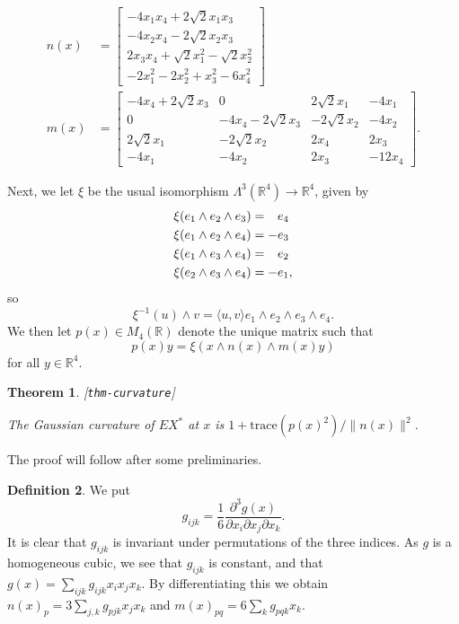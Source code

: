 \documentclass[reqno]{amsart}
\newcommand{\lbl}[1]{\label{#1}\textup{[\texttt{#1}]}\par}
\newcommand{\lbl}{\label}
\newcommand{\Lm}        {\Lambda}
\newcommand{\R}         {{\mathbb{R}}}
\newcommand{\ip}[1]     {\langle #1\rangle}
\newcommand{\rt}        {\sqrt{2}}
\newcommand{\pp}        {\hphantom{+}}
\renewcommand{\:}{\colon}
\newtheorem{theorem}{Theorem}[subsection]
\theoremstyle{definition}
\newtheorem{definition}[theorem]{Definition}
\begin{document}
\begin{align*}
 n(x) &= \left[\begin{array}{c}
           -4 x_1 x_4+2\rt x_1 x_3 \\
           -4 x_2 x_4-2\rt x_2 x_3 \\
           2 x_3 x_4+\rt x_1^2-\rt x_2^2 \\
           -2 x_1^2-2 x_2^2+x_3^2-6 x_4^2
         \end{array}\right] \\
 m(x) &=  \left[ \begin {array}{cccc}
            -4 x_4+2\rt x_3&0&2\rt x_1&-4 x_1 \\
            0&-4 x_4-2\rt x_3&-2\rt x_2&-4 x_2\\
            2\rt x_1&-2\rt x_2&2 x_4&2 x_3 \\
            -4 x_1&-4 x_2&2 x_3&-12 x_4
          \end {array} \right] .
\end{align*}

Next, we let $\xi$ be the usual isomorphism $\Lm^3(\R^4)\to\R^4$,
given by
\begin{align*}
 \xi(e_1\wedge e_2\wedge e_3) &= \pp e_4 \\
 \xi(e_1\wedge e_2\wedge e_4) &=    -e_3 \\
 \xi(e_1\wedge e_3\wedge e_4) &= \pp e_2 \\
 \xi(e_2\wedge e_3\wedge e_4) &=    -e_1,
\end{align*}
so
\[ \xi^{-1}(u)\wedge v =
     \ip{u,v} e_1\wedge e_2\wedge e_3\wedge e_4.
\]
We then let $p(x)\in M_4(\R)$ denote the unique matrix such that
\[ p(x)y = \xi(x\wedge n(x)\wedge m(x)y) \]
for all $y\in\R^4$.

\begin{theorem}\lbl{thm-curvature}
 The Gaussian curvature of $EX^*$ at $x$ is
 $1+\text{trace}(p(x)^2)/\|n(x)\|^2$.
\end{theorem}

The proof will follow after some preliminaries.

\begin{definition}
 We put
 \[ g_{ijk} = \frac{1}{6}
     \frac{\partial^3g(x)}{\partial x_i\partial x_j\partial x_k}.
 \]
 It is clear that $g_{ijk}$ is invariant under permutations of the
 three indices.  As $g$ is a homogeneous cubic, we see that $g_{ijk}$
 is constant, and that $g(x)=\sum_{ijk}g_{ijk}x_ix_jx_k$.  By
 differentiating this we obtain $n(x)_p=3\sum_{j,k}g_{pjk}x_jx_k$ and
 $m(x)_{pq}=6\sum_kg_{pqk}x_k$.
\end{definition}
\end{document}
